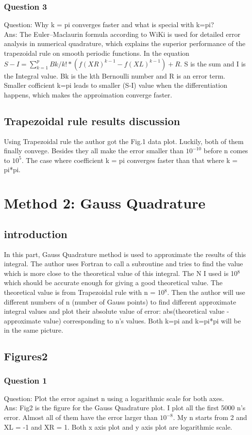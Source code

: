 \documentclass[titlepage]{article}
\begin{document}
\subsubsection{Question 3} 
Question: Why k = pi converges faster and what is special with k=pi?\\
Ans: The Euler–Maclaurin formula according to WiKi is used for detailed
error analysis in numerical quadrature, which explains the superior
performance of the trapezoidal rule on smooth periodic functions. In
the equation $S - I = \sum\limits_{k=1}^p Bk/k! * (f(XR)^{k-1} -
f(XL)^{k-1}) + R$. S is the sum and I is the Integral value. Bk is the
kth Bernoulli number and R is an error term. Smaller cofficient k=pi
leads to smaller (S-I) value when the differentiation happens, which makes
the approimation converge faster. 
\subsection{Trapezoidal rule results discussion}
Using Trapezoidal rule the author got the Fig.1 data plot. Luckily,
both of them finally convege. Besides they all make the error smaller
than $10^{-10}$ before n comes to $10^5$. The case where coefficient
k = pi converges faster than that where k = pi*pi. 


\section{Method 2: Gauss Quadrature}
\subsection{introduction}
In this part, Gauss Quadrature method is used to approximate the
results of this integral. The author uses Fortran to call a subroutine
and tries to find the value which is more close to the theoretical value of this
integral. The N I used is 10$^8$ which should be accurate enough for
giving a good theoretical value. The theoretical value is from Trapezoidal rule 
with n = 10$^8$. Then the author will use different numbers of
n (number of Gauss points) to find different approximate integral values
and plot their absolute value of error: abs(theoretical value -
approximate value) corresponding to n's values. Both k=pi and k=pi*pi
will be in the same picture.
\subsection{Figures2}
\subsubsection{Question 1} 
Question: Plot the error against n using a logarithmic scale for both axes.\\
Ans: Fig2 is the figure for the Gauss Quadrature plot. I plot all the
first 5000 n's error. Almost all of them have the error larger than
$10^{-8}$. My n starts from 2 and XL = -1 and XR = 1. Both x axis plot
and y axis plot are logarithmic scale. 
\end{document}
